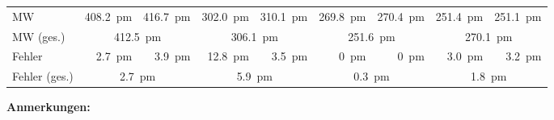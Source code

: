 \begin{table}[h!]
\begin{tabular}{lrrrrrrrr}
		\midrule

        MW             &
        \SI{408.2}{\pico\meter} &
        \SI{416.7}{\pico\meter} &
        \SI{302.0}{\pico\meter} &
        \SI{310.1}{\pico\meter} &
        \SI{269.8}{\pico\meter} &
        \SI{270.4}{\pico\meter} &
        \SI{251.4}{\pico\meter} &
        \SI{251.1}{\pico\meter} \\

        MW (ges.)      &
        \multicolumn{2}{c}{\SI{412.5}{\pico\meter}} &
        \multicolumn{2}{c}{\SI{306.1}{\pico\meter}} &
        \multicolumn{2}{c}{\SI{251.6}{\pico\meter}} &
        \multicolumn{2}{c}{\SI{270.1}{\pico\meter}} \\

		\midrule

        Fehler         &
         \SI{2.7}{\pico\meter} &
         \SI{3.9}{\pico\meter} &
        \SI{12.8}{\pico\meter} &
         \SI{3.5}{\pico\meter} &
         \SI{0}{\pico\meter} &
         \SI{0}{\pico\meter} &
         \SI{3.0}{\pico\meter} &
         \SI{3.2}{\pico\meter} \\

        Fehler (ges.)    &
        \multicolumn{2}{c}{\SI{2.7}{\pico\meter}} &
        \multicolumn{2}{c}{\SI{5.9}{\pico\meter}} &
        \multicolumn{2}{c}{\SI{0.3}{\pico\meter}} &
        \multicolumn{2}{c}{\SI{1.8}{\pico\meter}} \\

        \bottomrule
    \end{tabular}
\end{table}

\textbf{Anmerkungen:}

